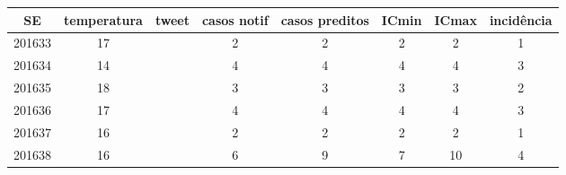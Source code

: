 \begin{tabular}{c|ccccccc}
  \hline
SE & temperatura & tweet & casos notif & casos preditos & ICmin & ICmax & incidência \\ 
  \hline
201633 & 17 &  & 2 & 2 & 2 & 2 & 1 \\ 
  201634 & 14 &  & 4 & 4 & 4 & 4 & 3 \\ 
  201635 & 18 &  & 3 & 3 & 3 & 3 & 2 \\ 
  201636 & 17 &  & 4 & 4 & 4 & 4 & 3 \\ 
  201637 & 16 &  & 2 & 2 & 2 & 2 & 1 \\ 
  201638 & 16 &  & 6 & 9 & 7 & 10 & 4 \\ 
   \hline
\end{tabular}
